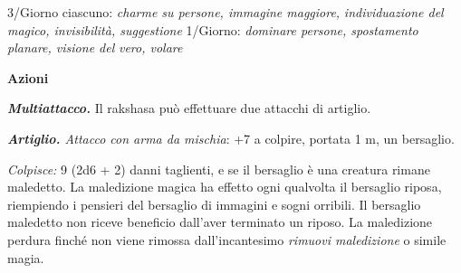 \begin{multicols}{2}
3/Giorno ciascuno: \emph{charme su persone, immagine maggiore,} \emph{individuazione del magico, invisibilità, suggestione} 1/Giorno: \emph{dominare persone, spostamento planare, visione del} \emph{vero, volare}

\textbf{Azioni}

\emph{\textbf{Multiattacco.}} Il rakshasa può effettuare due attacchi di artiglio.

\emph{\textbf{Artiglio.} Attacco con arma da mischia}: +7 a colpire, portata 1 m, un bersaglio.

\emph{Colpisce:} 9 (2d6 + 2) danni taglienti, e se il bersaglio è una creatura rimane maledetto. La maledizione magica ha effetto ogni qualvolta il bersaglio riposa, riempiendo i pensieri del bersaglio di immagini e sogni orribili. Il bersaglio maledetto non riceve beneficio dall'aver terminato un riposo. La maledizione perdura finché non viene rimossa dall'incantesimo \emph{rimuovi maledizione} o simile magia.


\end{multicols}
